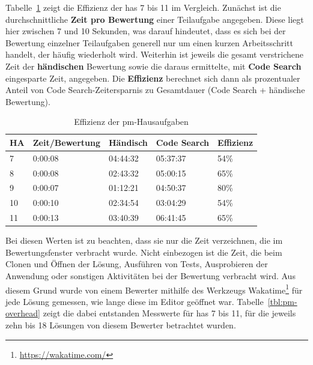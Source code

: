 Tabelle~\ref{tbl:pm-efficiency} zeigt die Effizienz der \acp{ha} 7 bis 11 im Vergleich.
Zunächst ist die durchschnittliche \textbf{Zeit pro Bewertung} einer Teilaufgabe angegeben.
Diese liegt hier zwischen 7 und 10 Sekunden, was darauf hindeutet, dass es sich bei der Bewertung einzelner Teilaufgaben generell nur um einen kurzen Arbeitsschritt handelt, der häufig wiederholt wird.
Weiterhin ist jeweils die gesamt verstrichene Zeit der \textbf{händischen} Bewertung sowie die daraus ermittelte, mit \textbf{Code Search} eingesparte Zeit, angegeben.
Die \textbf{Effizienz} berechnet sich dann als prozentualer Anteil von Code Search-Zeitersparnis zu Gesamtdauer (Code Search + händische Bewertung).

\begin{table}
    \centering
    \caption{Effizienz der \ac{pm}-Hausaufgaben}
    \begin{tabular}{|l|l|l|l|l|}
    \hline
        HA  & Zeit/Bewertung & Händisch & Code Search & Effizienz \\ \hline
        7   & 0:00:08 & 04:44:32 & 05:37:37 & 54\% \\ \hline
        8   & 0:00:08 & 02:43:32 & 05:00:15 & 65\% \\ \hline
        9   & 0:00:07 & 01:12:21 & 04:50:37 & 80\% \\ \hline
        10  & 0:00:10 & 02:34:54 & 03:04:29 & 54\% \\ \hline
        11  & 0:00:13 & 03:40:39 & 06:41:45	& 65\% \\ \hline
    \end{tabular}
    \label{tbl:pm-efficiency}
\end{table}

Bei diesen Werten ist zu beachten, dass sie nur die Zeit verzeichnen, die im Bewertungsfenster verbracht wurde.
Nicht einbezogen ist die Zeit, die beim Clonen und Öffnen der Lösung, Ausführen von Tests, Ausprobieren der Anwendung oder sonstigen Aktivitäten bei der Bewertung verbracht wird.
Aus diesem Grund wurde von einem Bewerter mithilfe des Werkzeugs Wakatime\footnote{
    \url{https://wakatime.com/}
} für jede Lösung gemessen, wie lange diese im Editor geöffnet war.
Tabelle~\ref{tbl:pm-overhead} zeigt die dabei entstanden Messwerte für \acp{ha} 7 bis 11, für die jeweils zehn bis 18 Lösungen von diesem Bewerter betrachtet wurden.

